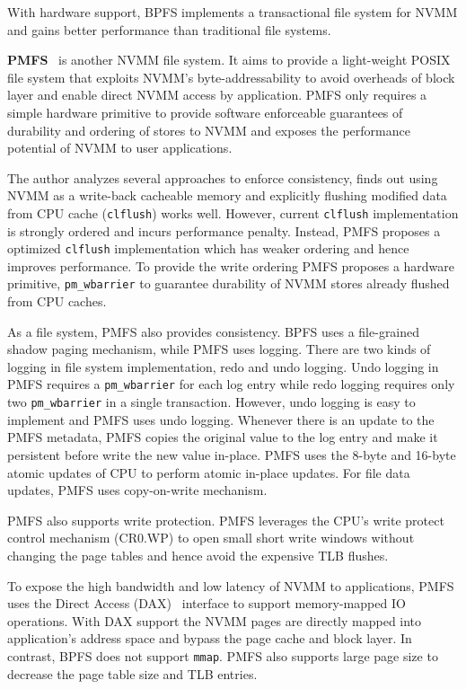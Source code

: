 With hardware support, BPFS implements a transactional file system for NVMM
and gains better performance than traditional file systems.


\textbf{PMFS}~\cite{PMFS} is another NVMM file system. It aims to
provide a
light-weight POSIX file system that exploits NVMM's byte-addressability to
avoid overheads of block layer and enable direct NVMM access by application.
PMFS only requires a simple hardware primitive to provide software enforceable
guarantees of durability and ordering of stores to NVMM and exposes the 
performance potential of NVMM to user applications.

The author analyzes several approaches to enforce consistency, finds out
using NVMM as a write-back cacheable memory and explicitly flushing modified
data from CPU cache (\texttt{clflush}) works well.
However, current \texttt{clflush}
implementation is strongly ordered and incurs performance penalty. Instead,
PMFS proposes a optimized \texttt{clflush} implementation which has weaker
 ordering
and hence improves performance. To provide the write ordering PMFS proposes
a hardware primitive, \texttt{pm\_wbarrier} to guarantee durability of NVMM stores
already flushed from CPU caches.

As a file system, PMFS also provides consistency. BPFS uses a file-grained
shadow paging mechanism, while PMFS uses logging. There are two kinds of logging
in file system implementation, redo and undo logging. Undo logging in PMFS
requires a \texttt{pm\_wbarrier} for each log entry while redo logging requires
only two \texttt{pm\_wbarrier} in a single transaction. However, undo logging
is easy to implement and PMFS uses undo logging. Whenever there is an update
to the PMFS metadata, PMFS copies the original value to the log entry and
make it persistent before write the new value in-place. PMFS uses the
8-byte and 16-byte atomic updates of CPU to perform atomic in-place updates.
For file data updates, PMFS uses copy-on-write mechanism.

PMFS also supports write protection. PMFS leverages
the CPU's write protect control mechanism (CR0.WP) to open small short write
windows without changing the page tables and hence avoid the expensive
TLB flushes.

To expose the high bandwidth and low latency of NVMM to applications,
PMFS uses the Direct Access (DAX)~\cite{ext4dax} interface to support
memory-mapped
IO operations. With DAX support the NVMM pages are directly mapped into
application's address space and bypass the page cache and block layer.
In contrast, BPFS does not support \texttt{mmap}.
PMFS also supports large page size to decrease the page table size and
TLB entries.

